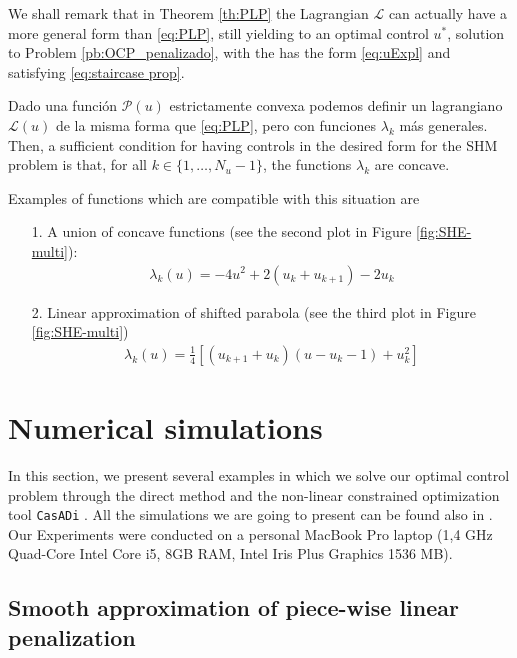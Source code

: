 \documentclass[twocolumn]{autart}    %
\begin{document}
\begin{remark}

We shall remark that in Theorem \ref{th:PLP} the Lagrangian $\mathcal L$ can actually have a more general form than \eqref{eq:PLP}, still yielding to an optimal control $u^\ast$, solution to Problem \ref{pb:OCP_penalizado}, with the has the form \eqref{eq:uExpl} and satisfying \eqref{eq:staircase prop}.

\JOStart
Dado una función $\mathcal{P}(u)$ estrictamente convexa podemos definir un lagrangiano $\mathcal{L}(u)$ de la misma forma que \eqref{eq:PLP}, pero con funciones $\lambda_k$ más generales. Then, a sufficient condition for having controls in the desired form for the SHM problem is that, for all $k \in \{1,\dots,N_u-1\}$, the functions $\lambda_k$ are concave.
\JOEnd

Examples of functions which are compatible with this situation are
\begin{enumerate}
    \item[1.] A union of concave functions (see the second plot in Figure \ref{fig:SHE-multi}):
    \begin{align*}
        \lambda_k(u) = -4u^2 + 2(u_k + u_{k+1}) - 2u_{k}
    \end{align*}
    \item[2.] Linear approximation of shifted parabola (see the third plot in Figure \ref{fig:SHE-multi})
    \begin{align*}
        \lambda_k(u) = \frac 1 4[(u_{k+1}+u_{k}) (u-u_k-1) + u_k^2]
    \end{align*}
\end{enumerate}
\end{remark}
\section{Numerical simulations}\label{sec:Simulations}

In this section, we present several examples in which we solve our optimal control problem through the direct method and the non-linear constrained optimization tool \texttt{CasADi} \cite{Andersson2019}. All the simulations we are going to present can be found also in \cite{simus}. Our Experiments were conducted on a personal MacBook Pro laptop (1,4 GHz Quad-Core Intel Core i5, 8GB RAM, Intel Iris Plus
Graphics 1536 MB). 
%
\subsection{Smooth approximation of piece-wise linear penalization}
\end{document}
